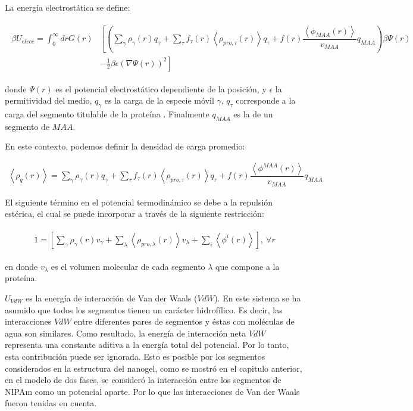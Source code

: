 La energ\'ia electrost\'atica se define:

\begin{align}
	\begin{aligned}
		\beta U_{elecc}= \int_0^\infty drG(r)&\left[\left(\sum_{\gamma } {\rho_\gamma(r) q_\gamma + \sum_\tau{f_\tau(r) \left<\rho_{pro,\tau}(r)\right> q_\tau} +  f(r)\dfrac{\left<\phi_{MAA}(r)\right>}{v_{MAA}}q_{MAA}}\right)\beta\Psi(r) \right. \\ &\left.-\frac{1}{2}\beta\epsilon(\nabla\Psi(r))^2 \right]
	\end{aligned}
\end{align} 

\noindent donde $\Psi(r)$ es el potencial electrost\'atico dependiente de la posici\'on, y $\epsilon$ la permitividad del medio, $q_\gamma$ es la carga de la especie m\'ovil $\gamma$, $q_\tau$ corresponde a la carga del segmento titulable de la prote\'ina . Finalmente $q_{MAA}$ es la de un segmento de $MAA$.

En este contexto, podemos definir la densidad de carga promedio: 

\begin{align}
	\left<\rho_q(r)\right> = \sum_{\gamma } {\rho_\gamma(r) q_\gamma + \sum_\tau{f_\tau(r) \left<\rho_{pro,\tau}(r)\right> q_\tau} +  f(r)\dfrac{\left<\phi^{MAA}(r)\right>}{v_{MAA}}q_{MAA}}
	\label{eq:esf:rho-charge}
\end{align}  
             
El siguiente t\'ermino en el potencial termodin\'amico se debe a la repulsi\'on est\'erica, el cual se puede incorporar a trav\'es de la siguiente restricci\'on:

\begin{align}
	\begin{aligned}
		1=  {\left[\sum_{\gamma}\rho_\gamma(r) v_\gamma + \sum_\lambda{\left<\rho_{pro,\lambda}(r)\right>v_\lambda} + \sum_i{\left<\phi^i(r)\right>}\right]},~ \forall r
	\end{aligned}
	\label{eq:esf:constraint}
\end{align}


\noindent en donde $v_\lambda$  es el volumen molecular de cada segmento $\lambda$  que compone a la prote\'ina.



$U_{VdW}$ es la energ\'ia de interacci\'on de Van der Waals ($VdW$). En este sistema se ha asumido que todos los segmentos tienen un car\'acter hidrof\'ilico. Es decir, las interacciones $VdW$ entre diferentes pares de segmentos y \'estas con mol\'eculas de agua son similares. Como resultado, la energ\'ia de interacci\'on neta $VdW$ representa una constante aditiva a la energ\'ia total del potencial.
Por lo tanto, esta contribuci\'on puede ser ignorada. 
Esto es posible por los segmentos considerados en la estructura del nanogel, como se mostr\'o en el capitulo anterior, en el modelo de dos fases, se consider\'o la interacci\'on entre los segmentos de NIPAm como un potencial aparte. Por lo que las interacciones de Van der Waals fueron tenidas en cuenta.



